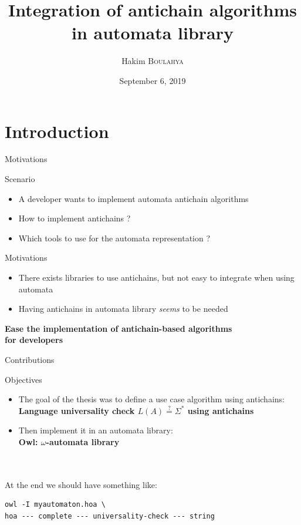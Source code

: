 \documentclass[10pt]{beamer}
\title{Integration of antichain algorithms \\ in automata library}  %
\date{September 6, 2019}
\author{
  Hakim \textsc{Boulahya}
}
\institute[
  Faculty of Science
  Université Libre de Bruxelles
  Belgium
] %
{%
    supervised by \\
    Emmanuel Filiot and
    Guillermo A. Pérez \\\


}
\begin{document}
{\aauwavesbg%
\begin{frame} %
  \titlepage
\end{frame}}

\section{Introduction}

\begin{frame}{Motivations}{}
    \begin{block}{Scenario}
      \begin{itemize}
        \item A developer wants to implement automata antichain algorithms
        \item How to implement antichains ?
        \item Which tools to use for the automata representation ?
      \end{itemize}
    \end{block}
    \begin{block}{Motivations}
        \begin{itemize}
            \item There exists libraries to use antichains, but not easy to integrate when using automata
            \item Having antichains in automata library \textit{seems} to be needed
        \end{itemize}
    \end{block}
    \begin{center}
        \textbf{Ease the implementation of antichain-based algorithms \\ for developers}
    \end{center}
\end{frame}

\begin{frame}[fragile]{Contributions}
  \begin{block}{Objectives}
      \begin{itemize}
          \item The goal of the thesis was to define a use case algorithm using antichains: \\ \textbf{Language universality check $L(A) \stackrel{?}{=} \Sigma^*$ using antichains}
          \item Then implement it in an automata library: \\ \textbf{Owl: $\omega$-automata library}
      \end{itemize}
\\~\\

At the end we should have something like:
      \begin{lstlisting}
owl -I myautomaton.hoa \
hoa --- complete --- universality-check --- string
      \end{lstlisting}
  \end{block}

\end{frame}
\end{document}
